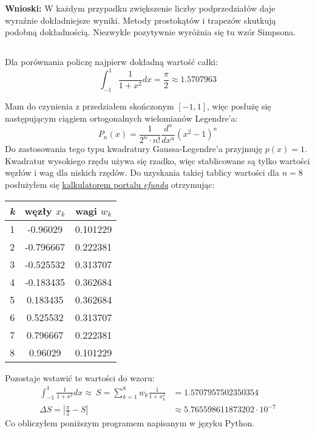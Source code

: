 \documentclass{article}
\begin{document}
\noindent
\textbf{Wnioski:} W każdym przypadku zwiększenie liczby podprzedziałów daje wyraźnie dokładniejsze wyniki. Metody prostokątów i trapezów skutkują podobną dokładnością. Niezwykle pozytywnie wyróżnia się tu wzór Simpsona.

\subsection{}
Dla porównania policzę najpierw dokładną wartość całki:
\[\int_{-1}^1 \frac{1}{1 + x^2}dx = \frac{\pi}{2} \approx 1.5707963\]

\noindent
Mam do czynienia z przedziałem skończonym \([-1, 1]\), więc posłużę się następującym ciągiem ortogonalnych wielomianów Legendre'a:
\[P_n(x) = \frac{1}{2^n \cdot n!} \frac{d^n}{dx^n}(x^2 - 1)^n\]
Do zastosowania tego typu kwadratury Gaussa-Legendre'a przyjmuję \(p(x) = 1\).\\
Kwadratur wysokiego rzędu używa się rzadko, więc stablicowane są tylko wartości węzłów i wag dla niskich rzędów. Do uzyskania takiej tablicy wartości dla \(n=8\) posłużyłem się \href{https://www.efunda.com/math/num_integration/findgausslegendre.cfm}{kalkulatorem portalu \textit{efunda}} otrzymując:

\begin{table}[h]
    \centering
    \begin{tabular}{c|c|c}
        \textit{k} & węzły \(x_k\) & wagi \(w_k\)\\
        \hline
        1 & -0.96029 & 0.101229\\
        2 & -0.796667 & 0.222381\\
        3 & -0.525532 & 0.313707\\
        4 & -0.183435 & 0.362684\\
        5 & 0.183435 & 0.362684\\
        6 & 0.525532 & 0.313707\\
        7 & 0.796667 & 0.222381\\
        8 & 0.96029 & 0.101229
    \end{tabular}
    \label{tab:table1}
\end{table}

\noindent
Pozostaje wstawić te wartości do wzoru:
\begin{align*}
    \int_{-1}^1 \frac{1}{1 + x^2}dx \approx\ S = \sum_{k=1}^8 w_k \frac{1}{1 + x_k^2} &= 1.5707957502350354\\
    \Delta S = \left|\frac{\pi}{2} - S\right| &\approx 5.765598611873202 \cdot 10^{-7}
\end{align*}
Co obliczyłem poniższym programem napisanym w języku Python.
\end{document}
